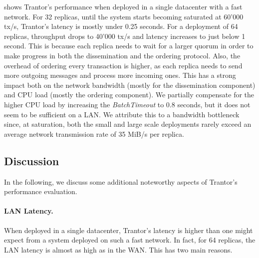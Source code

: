 \documentclass{article}
\begin{document}

 shows Trantor's performance when deployed in a single datacenter with a fast network.
For 32 replicas, until the system starts becoming saturated at 60'000 tx/s, Trantor's latency is mostly under 0.25 seconds.
For a deployment of 64 replicas, throughput drops to 40'000 tx/s and latency increases to just below 1 second.
This is because each replica needs to wait for a larger quorum in order to make progress in both the dissemination and the ordering protocol.
Also, the overhead of ordering every transaction is higher, as each replica needs to send more outgoing messages and process more incoming ones.
This has a strong impact both on the network bandwidth (mostly for the dissemination component) and CPU load (mostly the ordering component).
We partially compensate for the higher CPU load by increasing the \textit{BatchTimeout} to 0.8 seconds,
but it does not seem to be sufficient on a LAN.
We attribute this to a bandwidth bottleneck since, at saturation, both the small and large scale deployments
rarely exceed an average network transmission rate of 35 MiB/s per replica.

\subsection{Discussion}

In the following, we discuss some additional noteworthy aspects of Trantor's performance evaluation.

\paragraph{LAN Latency.}
When deployed in a single datacenter, Trantor's latency is higher than one might expect from a system deployed on such a fast network.
In fact, for 64 replicas, the LAN latency is almost as high as in the WAN.
This has two main reasons.
\end{document}
